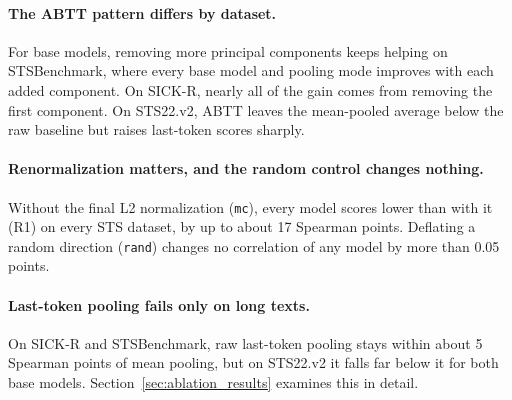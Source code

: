 \paragraph{The ABTT pattern differs by dataset.}
For base models, removing more principal components keeps helping on STSBenchmark, where every base model and pooling mode improves with each added component. On SICK-R, nearly all of the gain comes from removing the first component. On STS22.v2, ABTT leaves the mean-pooled average below the raw baseline but raises last-token scores sharply.

\paragraph{Renormalization matters, and the random control changes nothing.}
Without the final L2 normalization (\texttt{mc}), every model scores lower than with it (R1) on every STS dataset, by up to about 17 Spearman points. Deflating a random direction (\texttt{rand}) changes no correlation of any model by more than 0.05 points.

\paragraph{Last-token pooling fails only on long texts.}
On SICK-R and STSBenchmark, raw last-token pooling stays within about 5 Spearman points of mean pooling, but on STS22.v2 it falls far below it for both base models. Section~\ref{sec:ablation_results} examines this in detail.
